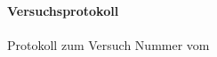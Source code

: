 \begin{titlepage}
    \vspace*{4cm}
    \begin{center}
        \Huge
           \textbf{ Versuchsprotokoll {\varNum}}\\
           \varName\\
        \vspace{1cm}
        \large
        Protokoll zum Versuch Nummer {\varNum} vom \varDate \\
        \vspace{2,5cm}

        \vspace{1,5cm}
        \varAutor \\  
        \vspace{1cm}
        \normalsize
        \textit{\varGruppe} \\
    \end{center}
\end{titlepage}
